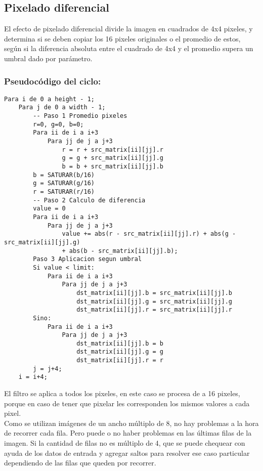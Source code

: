 \subsection{Pixelado diferencial}
El efecto de pixelado diferencial divide la imagen en cuadrados de 4x4 pixeles, y determina si se deben copiar los 16 pixeles originales o el promedio de estos, según si la diferencia absoluta entre el cuadrado de 4x4 y el promedio supera un umbral dado por parámetro.

\subsubsection{Pseudocódigo del ciclo:}

\begin{codesnippet}
\begin{verbatim}
Para i de 0 a height - 1;
    Para j de 0 a width - 1; 
        -- Paso 1 Promedio pixeles
        r=0, g=0, b=0;
        Para ii de i a i+3
            Para jj de j a j+3
                r = r + src_matrix[ii][jj].r
                g = g + src_matrix[ii][jj].g
                b = b + src_matrix[ii][jj].b
        b = SATURAR(b/16)
        g = SATURAR(g/16)
        r = SATURAR(r/16)
        -- Paso 2 Calculo de diferencia
        value = 0
        Para ii de i a i+3
            Para jj de j a j+3
                value += abs(r - src_matrix[ii][jj].r) + abs(g - src_matrix[ii][jj].g) 
                + abs(b - src_matrix[ii][jj].b);
        Paso 3 Aplicacion segun umbral
        Si value < limit:
            Para ii de i a i+3
                Para jj de j a j+3
                    dst_matrix[ii][jj].b = src_matrix[ii][jj].b
                    dst_matrix[ii][jj].g = src_matrix[ii][jj].g
                    dst_matrix[ii][jj].r = src_matrix[ii][jj].r
        Sino:
            Para ii de i a i+3
                Para jj de j a j+3
                    dst_matrix[ii][jj].b = b
                    dst_matrix[ii][jj].g = g
                    dst_matrix[ii][jj].r = r
        j = j+4;
    i = i+4;
\end{verbatim}
\end{codesnippet}
El filtro se aplica a todos los pixeles, en este caso se procesa de a 16 pixeles, porque en caso de tener que pixelar les corresponden los mismos valores a cada pixel. \\
Como se utilizan imágenes de un ancho múltiplo de 8, no hay problemas a la hora de recorrer cada fila. Pero puede o no haber problemas en las últimas filas de la imagen. Si la cantidad de filas no es múltiplo de 4, que se puede chequear con ayuda de los datos de entrada y agregar saltos para resolver ese caso particular dependiendo de las filas que queden por recorrer. \\

